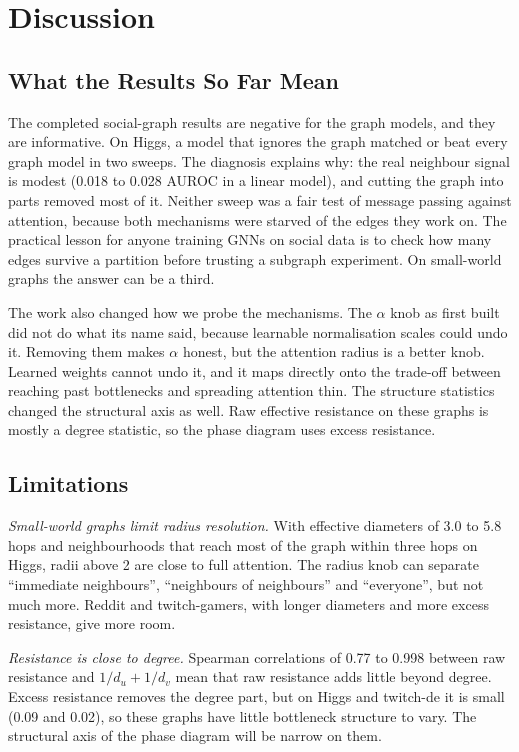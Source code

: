 \section{Discussion}
\subsection{What the Results So Far Mean}
The completed social-graph results are negative for the graph models, and they are informative. On Higgs, a model that ignores the graph matched or beat every graph model in two sweeps. The diagnosis explains why: the real neighbour signal is modest (0.018 to 0.028 AUROC in a linear model), and cutting the graph into parts removed most of it. Neither sweep was a fair test of message passing against attention, because both mechanisms were starved of the edges they work on. The practical lesson for anyone training GNNs on social data is to check how many edges survive a partition before trusting a subgraph experiment. On small-world graphs the answer can be a third.

The work also changed how we probe the mechanisms. The $\alpha$ knob as first built did not do what its name said, because learnable normalisation scales could undo it. Removing them makes $\alpha$ honest, but the attention radius is a better knob. Learned weights cannot undo it, and it maps directly onto the trade-off between reaching past bottlenecks and spreading attention thin. The structure statistics changed the structural axis as well. Raw effective resistance on these graphs is mostly a degree statistic, so the phase diagram uses excess resistance.

\subsection{Limitations}
\emph{Small-world graphs limit radius resolution.} With effective diameters of 3.0 to 5.8 hops and neighbourhoods that reach most of the graph within three hops on Higgs, radii above 2 are close to full attention. The radius knob can separate ``immediate neighbours'', ``neighbours of neighbours'' and ``everyone'', but not much more. Reddit and twitch-gamers, with longer diameters and more excess resistance, give more room.

\emph{Resistance is close to degree.} Spearman correlations of 0.77 to 0.998 between raw resistance and $1/d_u+1/d_v$ mean that raw resistance adds little beyond degree. Excess resistance removes the degree part, but on Higgs and twitch-de it is small (0.09 and 0.02), so these graphs have little bottleneck structure to vary. The structural axis of the phase diagram will be narrow on them.

